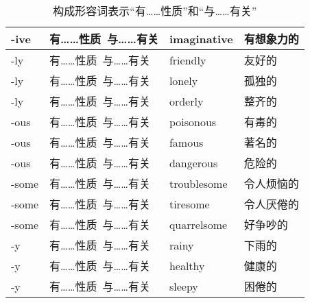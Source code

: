 \documentclass[UTF8]{ctexart}
\begin{document}
\begin{table}[h!]
\begin{center}
\begin{tabular}{p{40pt}|p{120pt}|p{80pt}|p{80pt}}
                -ive&有……性质~与……有关&imaginative&有想象力的\\ \hline
                -ly&有……性质~与……有关&friendly&友好的\\ \hline
                -ly&有……性质~与……有关&lonely&孤独的\\ \hline
                -ly&有……性质~与……有关&orderly&整齐的\\ \hline
                -ous&有……性质~与……有关&poisonous&有毒的\\ \hline
                -ous&有……性质~与……有关&famous&著名的\\ \hline
                -ous&有……性质~与……有关&dangerous&危险的\\ \hline
                -some&有……性质~与……有关&troublesome&令人烦恼的\\ \hline
                -some&有……性质~与……有关&tiresome&令人厌倦的\\ \hline
                -some&有……性质~与……有关&quarrelsome&好争吵的\\ \hline
                -y&有……性质~与……有关&rainy&下雨的\\ \hline
                -y&有……性质~与……有关&healthy&健康的\\ \hline
                -y&有……性质~与……有关&sleepy&困倦的\\ \hline
            \end{tabular}
            \rmfamily
            \caption{构成形容词表示“有……性质”和“与……有关”}
        \end{center}
    \end{table}

\newpage
\end{document}
